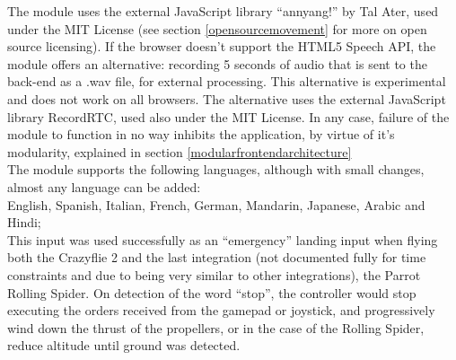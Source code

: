 The module uses the external JavaScript library ``annyang!'' by Tal Ater\cite{annyang15}, used under the MIT License (see 
section \ref{opensourcemovement} for more on open source licensing). If the browser doesn't support the HTML5 Speech API, the 
module offers an alternative: recording 5 seconds of audio that is sent to the back-end as a .wav file, for external 
processing. This alternative is experimental and does not work on all browsers. The alternative uses the external JavaScript 
library RecordRTC\cite{recordrtc15}, used also under the MIT License. In any case, failure of the module to function in no way 
inhibits the application, by virtue of it's modularity, explained in section \ref{modularfrontendarchitecture}\\

The module supports the following languages, although with small changes, almost any language can be added:\\

English, Spanish, Italian, French, German, Mandarin, Japanese, Arabic and Hindi;\\

This input was used successfully as an ``emergency'' landing input when flying both the Crazyflie 2 and the last integration 
(not documented fully for time constraints and due to being very similar to other integrations), the Parrot Rolling Spider. On 
detection of the word ``stop'', the controller would stop executing the orders received from the gamepad or joystick, and 
progressively wind down the thrust of the propellers, or in the case of the Rolling Spider, reduce altitude until ground was 
detected.
